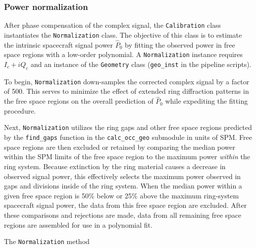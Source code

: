 \documentclass[titlepage, 12pt]{article}
\begin{document}
            \subsubsection{Power normalization}
                After phase compensation of the complex signal, the
                \texttt{Calibration} class instantiates the
                \texttt{Normalization} class. The objective of this class is
                to estimate the intrinsic spacecraft signal power $\hat{P}_0$
                by fitting the observed power in free space regions with a
                low-order polynomial. A \texttt{Normalization} instance requires
                $I_c+iQ_c$ and an instance of the \texttt{Geometry} class
                (\texttt{geo\_inst} in the pipeline scripts).
                \par\hfill\par
                To begin, \texttt{Normalization} down-samples the corrected
                complex signal by a factor of 500. This serves to minimize the
                effect of extended ring diffraction patterns in the free space regions
                on the overall prediction of $\hat{P}_0$ while expediting the
                fitting procedure.
                \par\hfill\par
                Next, \texttt{Normalization} utilizes the ring gaps and other
                free space regions predicted by the \texttt{find\_gaps} function
                in the \texttt{calc\_occ\_geo} submodule in units of SPM. Free
                space regions are then excluded or retained by comparing the
                median power within the SPM limits of the free space region to
                the maximum power \textit{within} the ring system. Because
                extinction by the ring material causes a decrease in observed
                signal power, this effectively selects the maximum power observed
                in gaps and divisions inside of the ring system. When the median
                power within a given free space region is 50\% below or 25\%
                above the maximum ring-system spacecraft signal power, the data
                from this free space region are excluded. After these comparisons
                and rejections are made, data from all remaining free space
                regions are assembled for use in a polynomial fit.
                \par\hfill\par
                The \texttt{Normalization} method 
\end{document}
